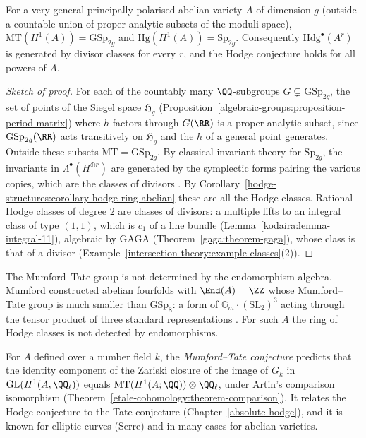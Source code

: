 \begin{theorem}\label{hodge-structures:theorem-very-general}
For a very general principally polarised abelian variety $A$ of dimension $g$ (outside a countable union of proper analytic subsets of the moduli space), $\mathrm{MT}(H^1(A)) = \mathrm{GSp}_{2g}$ and
$\mathrm{Hg}(H^1(A)) = \mathrm{Sp}_{2g}$. Consequently $\mathrm{Hdg}^\bullet(A^r)$ is generated by divisor classes for every $r$, and the Hodge conjecture holds for all powers of $A$.
\end{theorem}

\begin{proof}[Sketch of proof]
For each of the countably many $\QQ$-subgroups $G \subsetneq \mathrm{GSp}_{2g}$, the set of points of the Siegel space $\mathfrak{H}_g$ (Proposition~\ref{algebraic-groups:proposition-period-matrix})
where $h$ factors through $G(\RR)$ is a proper analytic subset, since $\mathrm{GSp}_{2g}(\RR)$ acts transitively on $\mathfrak{H}_g$ and the $h$ of a general point generates. Outside these
subsets $\mathrm{MT} = \mathrm{GSp}_{2g}$. By classical invariant theory for $\mathrm{Sp}_{2g}$, the invariants in $\Lambda^\bullet(H^{\oplus r})$ are generated by the symplectic forms pairing the
various copies, which are the classes of divisors \cite{birkenhake-lange}. By Corollary~\ref{hodge-structures:corollary-hodge-ring-abelian} these are all the Hodge classes. Rational Hodge classes of
degree $2$ are classes of divisors: a multiple lifts to an integral class of type $(1,1)$, which is $c_1$ of a line bundle (Lemma~\ref{kodaira:lemma-integral-11}), algebraic by GAGA
(Theorem~\ref{gaga:theorem-gaga}), whose class is that of a divisor (Example~\ref{intersection-theory:example-classes}(2)).
\end{proof}

\begin{remark}\label{hodge-structures:remark-mumford-example}
The Mumford--Tate group is not determined by the endomorphism algebra. Mumford constructed abelian fourfolds with $\End(A) = \ZZ$ whose Mumford--Tate group is much smaller than
$\mathrm{GSp}_8$: a form of $\mathbb{G}_m \cdot (\mathrm{SL}_2)^3$ acting through the tensor product of three standard representations \cite{mumford-1969}. For such $A$ the ring of Hodge
classes is not detected by endomorphisms.
\end{remark}

\begin{remark}\label{hodge-structures:remark-mumford-tate-conjecture}
For $A$ defined over a number field $k$, the \emph{Mumford--Tate conjecture} predicts that the identity component of the Zariski closure of the image of $G_k$ in $\mathrm{GL}(H^1(\bar A, \QQ_\ell))$
equals $\mathrm{MT}(H^1(A; \QQ)) \otimes \QQ_\ell$, under Artin's comparison isomorphism (Theorem~\ref{etale-cohomology:theorem-comparison}). It relates the Hodge conjecture to the Tate conjecture
(Chapter~\ref{absolute-hodge}), and it is known for elliptic curves (Serre) and in many cases for abelian varieties.
\end{remark}

